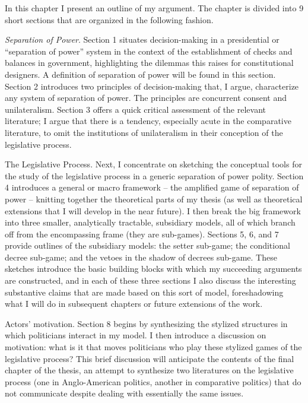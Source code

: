 In this chapter I present an outline of my argument.  The chapter is divided into 9 short sections that are organized in the following fashion.  

\emph{Separation of Power}.  Section 1 situates decision-making in a presidential or “separation of power” system in the context of the establishment of checks and balances in government, highlighting the dilemmas this raises for constitutional designers.  A definition of separation of power will be found in this section.  Section 2 introduces two principles of decision-making that, I argue, characterize any system of separation of power.  The principles are concurrent consent and unilateralism.  Section 3 offers a quick critical assessment of the relevant literature; I argue that there is a tendency, especially acute in the comparative literature, to omit the institutions of unilateralism in their conception of the legislative process.  

The Legislative Process.  Next, I concentrate on sketching the conceptual tools for the study of the legislative process in a generic separation of power polity.  Section 4 introduces a general or macro framework – the amplified game of separation of power – knitting together the theoretical parts of my thesis (as well as theoretical extensions that I will develop in the near future).  I then break the big framework into three smaller, analytically tractable, subsidiary models, all of which branch off from the encompassing frame (they are sub-games).  Sections 5, 6, and 7 provide outlines of the subsidiary models: the setter sub-game; the conditional decree sub-game; and the vetoes in the shadow of decrees sub-game.  These sketches introduce the basic building blocks with which my succeeding arguments are constructed, and in each of these three sections I also discuss the interesting substantive claims that are made based on this sort of model, foreshadowing what I will do in subsequent chapters or future extensions of the work.  

Actors' motivation.  Section 8 begins by synthesizing the stylized structures in which politicians interact in my model.  I then introduce a discussion on motivation: what is it that moves politicians who play these stylized games of the legislative process?  This brief discussion will anticipate the contents of the final chapter of the thesis, an attempt to synthesize two literatures on the legislative process (one in Anglo-American politics, another in comparative politics) that do not communicate despite dealing with essentially the same issues.  

